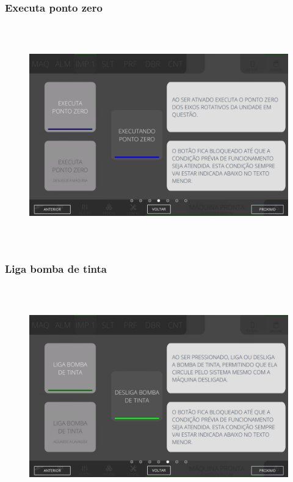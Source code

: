\newpage
\thispagestyle{fancy}
\vspace*{40 pt}
\subsubsection{\small{Executa ponto zero}}\label{miniTelaComandoImpressoraExecutaPontoZero}
\vspace*{\fill}
\begin{figure}[h]
  \centering
  \includegraphics[width=576px,height=360px]{src/imagesMiniline/04-Printer/commands/e4.png}
\end{figure}
\vspace*{\fill}

\newpage
\thispagestyle{fancy}
\vspace*{40 pt}
\subsubsection{\small{Liga bomba de tinta}}\label{miniTelaComandoImpressoraLigaBombaDeTinta}
\vspace*{\fill}
\begin{figure}[h]
  \centering
  \includegraphics[width=576px,height=360px]{src/imagesMiniline/04-Printer/commands/e5.png}
\end{figure}
\vspace*{\fill}

